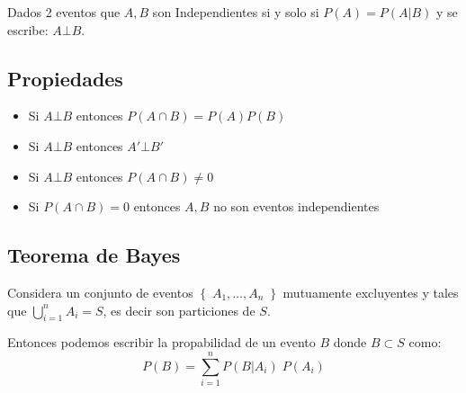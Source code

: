\documentclass[12pt, fleqn]{report}                             %
\theoremstyle{break}                                            %
\newcommand{\Set}[1]{\left\{ \; #1 \; \right\}}                 %
\begin{document}
            Dados 2 eventos que $A, B$ son Independientes si y solo si
            $P(A) = P(A | B)$ y se escribe: $A \bot B$.


            \subsection{Propiedades}

                \begin{itemize}
                   
                    \item
                        Si $A \bot B$ entonces $P(A \cap B) = P(A) P(B)$
                        
                    \item
                        Si $A \bot B$ entonces $A' \bot B'$

                    \item
                        Si $A \bot B$ entonces $P(A \cap B) \neq 0$

                    \item
                        Si $P(A \cap B) = 0$ entonces $A, B$ no son eventos independientes

                \end{itemize}




            \subsection{Teorema de Bayes}

                Considera un conjunto de eventos $\Set{A_1, \dots, A_n}$ mutuamente excluyentes
                y tales que $\displaystyle \bigcup_{i=1}^n A_i = S$, es decir son particiones de $S$.

                Entonces podemos escribir la propabilidad de un evento $B$ donde $B \subset S$ como:
                \begin{equation*}
                    P(B) 
                        = \sum_{i = 1}^n P(B | A_i) \; P(A_i) 
                \end{equation*}
\end{document}
